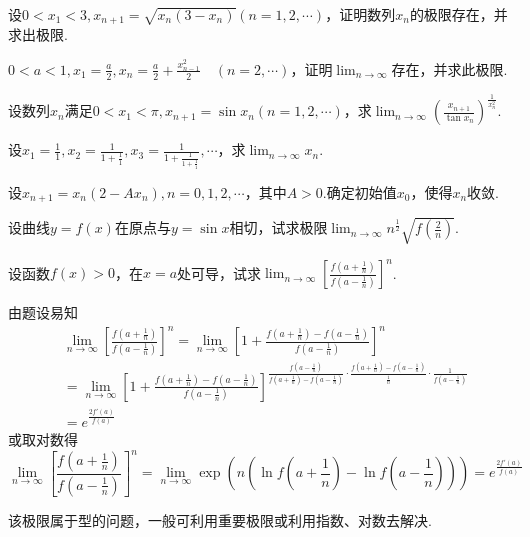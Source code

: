 \begin{xiti}
\item 设$0<x_{1}<3,x _ { n + 1 } = \sqrt { x _ { n } \left( 3 - x _ { n } \right) } ( n = 1,2 , \cdots )$，证明数列${x_{n}}$的极限存在，并求出极限.
\item $0 < a < 1 , x _ { 1 } = \frac { a } { 2 } , x _ { n } = \frac { a } { 2 } + \frac { x _ { n - 1 } ^ { 2 } } { 2 } \quad ( n = 2 , \cdots )$，证明$\lim_{ n \rightarrow \infty }$存在，并求此极限.
\item 设数列${x_{n}}$满足$0 < x _ { 1 } < \pi , x _ { n + 1 } = \sin x _ { n } ( n = 1,2 , \cdots )$，求$\lim _ { n \rightarrow \infty } \left( \frac { x _ { n + 1 } } { \tan x _ { n } } \right) ^ { \frac { 1 } { x _ { n } ^ { 2 } } }$.
\item 设$x _ { 1 } = \frac { 1 } { 1 } , x _ { 2 } = \frac { 1 } { 1 + \frac { 1 } { 1 } } , x _ { 3 } = \frac { 1 } { 1 + \frac { 1 } { 1 + \frac { 1 } { 1 } } } , \cdots$，求$\lim_{ n \rightarrow \infty }x_{n}$.
\item 设$x _ { n + 1 } = x _ { n } \left( 2 - A x _ { n } \right) , n = 0,1,2 , \cdots$，其中$A>0$.确定初始值$x_{0}$，使得${x_{n}}$收敛.
\item 设曲线$y=f(x)$在原点与$y=\sin x$相切，试求极限$\lim _ { n \rightarrow \infty } n ^ { \frac { 1 } { 2 } } \sqrt { f \left( \frac { 2 } { n } \right) }$.
\item 设函数$f(x)>0$，在$x=a$处可导，试求$\lim _ { n \rightarrow \infty } \left[ \frac { f \left( a + \frac { 1 } { n } \right) } { f \left( a - \frac { 1 } { n } \right) } \right] ^ { n }$.
\begin{solution}
由题设易知
\begin{equation*}
	\begin{aligned}
	&\lim_{n\rightarrow\infty}\left[\frac{f\left(a+\frac{1}{n}\right)}{f\left(a-\frac{1}{n}\right)}\right]^n=\lim_{n\rightarrow\infty}\left[1+\frac{f\left(a+\frac{1}{n}\right)-f\left(a-\frac{1}{n}\right)}{f\left(a-\frac{1}{n}\right)}\right]^n\\
	&=\lim_{n\rightarrow\infty}\left[1+\frac{f\left(a+\frac{1}{n}\right)-f\left(a-\frac{1}{n}\right)}{f\left(a-\frac{1}{n}\right)}\right]^{\frac{f\left(a-\frac{1}{n}\right)}{f\left(a+\frac{1}{n}\right)-f\left(a-\frac{1}{n}\right)}\cdot\frac{f\left(a+\frac{1}{n}\right)-f\left(a-\frac{1}{n}\right)}{\frac{1}{n}}\cdot\frac{1}{f\left(a-\frac{1}{n}\right)}}\\
	&=e^{\frac{2f'\left(a\right)}{f\left(a\right)}}
	\end{aligned}
\end{equation*}
或取对数得
\[
\lim_{n\rightarrow\infty}\left[\frac{f\left(a+\frac{1}{n}\right)}{f\left(a-\frac{1}{n}\right)}\right]^n=\lim_{n\rightarrow\infty}\exp\left(n\left(\ln f\left(a+\frac{1}{n}\right)-\ln f\left(a-\frac{1}{n}\right)\right)\right)=e^{\frac{2f'\left(a\right)}{f\left(a\right)}}
\]
\end{solution}
\begin{note}
	该极限属于型的问题，一般可利用重要极限或利用指数、对数去解决.
\end{note}


\end{xiti}
